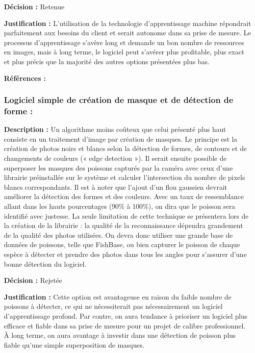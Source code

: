 \textbf{Décision :} Retenue

\textbf{Justification :} L’utilisation de la technologie d’apprentissage machine répondrait parfaitement aux besoins du client et serait autonome dans sa prise de mesure. Le processus d’apprentissage s’avère long et demande un bon nombre de ressources en images, mais à long terme, le logiciel peut s’avérer plus profitable, plus exact et plus précis que la majorité des autres options présentées plus bas. 

\textbf{Références :}


\subsubsection{Logiciel simple de création de masque et de détection de forme :}

\textbf{Description :} Un algorithme moins coûteux que celui présenté plus haut consiste en un traitement d’image par création de masques. Le principe est la création de photos noirs et blancs selon la détection de formes, de contours et de changements de couleurs (« edge detection »). Il serait ensuite possible de superposer les masques des poissons capturés par la caméra avec ceux d’une librairie préinstallée sur le système et calculer l’intersection du nombre de pixels blancs correspondants. Il est à noter que l’ajout d’un flou gaussien devrait améliorer la détection des formes et des couleurs. Avec un taux de ressemblance allant dans les hauts pourcentages (90\% à 100\%), on dira que le poisson sera identifié avec justesse. La seule limitation de cette technique se présentera lors de la création de la librairie : la qualité de la reconnaissance dépendra grandement de la qualité des photos utilisées. On devra donc utiliser une grande base de données de poissons, telle que FishBase, ou bien capturer le poisson de chaque espèce à détecter et prendre des photos dans tous les angles pour s’assurer d’une bonne détection du logiciel. 

\textbf{Décision :} Rejetée

\textbf{Justification :} Cette option est avantageuse en raison du faible nombre de poissons à détecter, ce qui ne nécessiterait pas nécessairement un logiciel d’apprentissage profond. Par contre, on aura tendance à prioriser un logiciel plus efficace et fiable dans sa prise de mesure pour un projet de calibre professionnel. À long terme, on aura avantage à investir dans une détection de poisson plus fiable qu’une simple superposition de masques.

